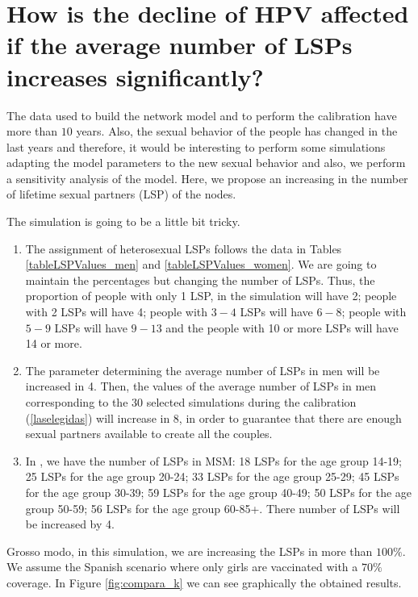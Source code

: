 \section{How is the decline of HPV affected if the average number of LSPs increases significantly?}

The data used to build the network model and to perform the calibration have more than $10$ years. Also, the sexual behavior of the people has changed in the last years and therefore, it would be interesting to perform some simulations adapting the model parameters to the new sexual behavior and also, we perform a sensitivity analysis of the model. Here, we propose an increasing in the number of lifetime sexual partners (LSP) of the nodes.

The simulation is going to be a little bit tricky. 

\begin{enumerate}
	\item The assignment of heterosexual LSPs follows the data in Tables \ref{tableLSPValues_men} and \ref{tableLSPValues_women}. We are going to maintain the percentages but changing the number of LSPs. Thus, the proportion of people with only 1 LSP, in the simulation will have 2; people with 2 LSPs will have 4; people with $3-4$ LSPs will have $6-8$; people with $5-9$ LSPs will have $9-13$ and the people with 10 or more LSPs will have 14 or more.
	\item The parameter determining the average number of LSPs in men will be increased in 4. Then, the values of the average number of LSPs in men corresponding to the $30$ selected simulations during the calibration (\ref{laselegidas}) will increase in 8, in order to guarantee that there are enough sexual partners available to create all the couples.
	\item In \cite{Durex2002}, we have the number of LSPs in MSM: 18 LSPs for the age group 14-19; 25 LSPs for the age group 20-24; 33 LSPs for the age group 25-29; 45 LSPs for the age group 30-39; 59 LSPs for the age group 40-49; 50 LSPs for the age group 50-59; 56 LSPs for the age group 60-85+. There number of LSPs will be increased by 4.   
\end{enumerate}

Grosso modo, in this simulation, we are increasing the LSPs in more than $100\%$. We assume the Spanish scenario where only girls are vaccinated with a $70\%$ coverage. In Figure \ref{fig:compara_k} we can see graphically the obtained results. 

